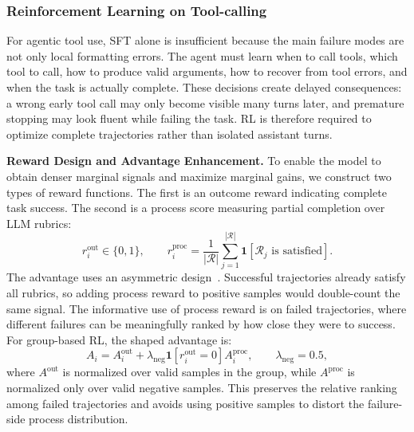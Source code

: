 \documentclass{llmxive}
\begin{document}

\subsubsection{Reinforcement Learning on Tool-calling}
For agentic tool use, SFT alone is insufficient because the main failure modes are not only local formatting errors. The agent must learn when to call tools, which tool to call, how to produce valid arguments, how to recover from tool errors, and when the task is actually complete. These decisions create delayed consequences: a wrong early tool call may only become visible many turns later, and premature stopping may look fluent while failing the task. RL is therefore required to optimize complete trajectories rather than isolated assistant turns.

\textbf{Reward Design and Advantage Enhancement.} To enable the model to obtain denser marginal signals and maximize marginal gains, we construct two types of reward functions. The first is an outcome reward indicating complete task success. The second is a process score measuring partial completion over LLM rubrics:
\begin{equation}
r_i^{\mathrm{out}} \in \{0,1\},
\qquad
r_i^{\mathrm{proc}}
=
\frac{1}{|\mathcal{R}|}
\sum_{j=1}^{|\mathcal{R}|}
\mathbf{1}[\mathcal{R}_j \text{ is satisfied}].
\end{equation}
The advantage uses an asymmetric design~\citep{tan2026papostabilizingrubricintegration}. Successful trajectories already satisfy all rubrics, so adding process reward to positive samples would double-count the same signal. The informative use of process reward is on failed trajectories, where different failures can be meaningfully ranked by how close they were to success. For group-based RL, the shaped advantage is: 
\begin{equation}
A_i
=
A_i^{\mathrm{out}}
+
\lambda_{\mathrm{neg}}
\mathbf{1}[r_i^{\mathrm{out}}=0]
A_i^{\mathrm{proc}},
\qquad
\lambda_{\mathrm{neg}}=0.5,
\end{equation}
where $A^{\mathrm{out}}$ is normalized over valid samples in the group, while $A^{\mathrm{proc}}$ is normalized only over valid negative samples. This preserves the relative ranking among failed trajectories and avoids using positive samples to distort the failure-side process distribution.
\end{document}

